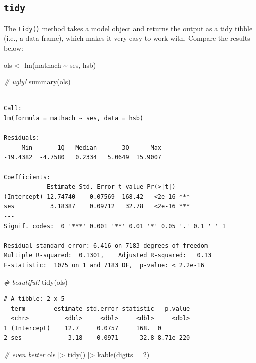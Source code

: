\documentclass[
  letterpaper,
  DIV=11,
  numbers=noendperiod]{scrreprt}
\newenvironment{Shaded}{}{}
\newcommand{\AttributeTok}[1]{\textcolor[rgb]{0.49,0.56,0.16}{#1}}
\newcommand{\CommentTok}[1]{\textcolor[rgb]{0.38,0.63,0.69}{\textit{#1}}}
\newcommand{\DecValTok}[1]{\textcolor[rgb]{0.25,0.63,0.44}{#1}}
\newcommand{\FunctionTok}[1]{\textcolor[rgb]{0.02,0.16,0.49}{#1}}
\newcommand{\NormalTok}[1]{#1}
\newcommand{\OtherTok}[1]{\textcolor[rgb]{0.00,0.44,0.13}{#1}}
\newcommand{\SpecialCharTok}[1]{\textcolor[rgb]{0.25,0.44,0.63}{#1}}
\begin{document}
\subsection{\texorpdfstring{\texttt{tidy}}{tidy}}\label{tidy}

The \texttt{tidy()} method takes a model object and returns the output
as a tidy tibble (i.e., a data frame), which makes it very easy to work
with. Compare the results below:

\begin{Shaded}
\begin{Highlighting}[]
\NormalTok{ols }\OtherTok{\textless{}{-}} \FunctionTok{lm}\NormalTok{(mathach }\SpecialCharTok{\textasciitilde{}}\NormalTok{ ses, hsb)}

\CommentTok{\# ugly!}
\FunctionTok{summary}\NormalTok{(ols)}
\end{Highlighting}
\end{Shaded}

\begin{verbatim}

Call:
lm(formula = mathach ~ ses, data = hsb)

Residuals:
     Min       1Q   Median       3Q      Max 
-19.4382  -4.7580   0.2334   5.0649  15.9007 

Coefficients:
            Estimate Std. Error t value Pr(>|t|)    
(Intercept) 12.74740    0.07569  168.42   <2e-16 ***
ses          3.18387    0.09712   32.78   <2e-16 ***
---
Signif. codes:  0 '***' 0.001 '**' 0.01 '*' 0.05 '.' 0.1 ' ' 1

Residual standard error: 6.416 on 7183 degrees of freedom
Multiple R-squared:  0.1301,    Adjusted R-squared:   0.13 
F-statistic:  1075 on 1 and 7183 DF,  p-value: < 2.2e-16
\end{verbatim}

\begin{Shaded}
\begin{Highlighting}[]
\CommentTok{\# beautiful!}
\FunctionTok{tidy}\NormalTok{(ols)}
\end{Highlighting}
\end{Shaded}

\begin{verbatim}
# A tibble: 2 x 5
  term        estimate std.error statistic   p.value
  <chr>          <dbl>     <dbl>     <dbl>     <dbl>
1 (Intercept)    12.7     0.0757     168.  0        
2 ses             3.18    0.0971      32.8 8.71e-220
\end{verbatim}

\begin{Shaded}
\begin{Highlighting}[]
\CommentTok{\# even better}
\NormalTok{ols }\SpecialCharTok{|\textgreater{}} \FunctionTok{tidy}\NormalTok{() }\SpecialCharTok{|\textgreater{}} \FunctionTok{kable}\NormalTok{(}\AttributeTok{digits =} \DecValTok{2}\NormalTok{)}
\end{Highlighting}
\end{Shaded}
\end{document}
